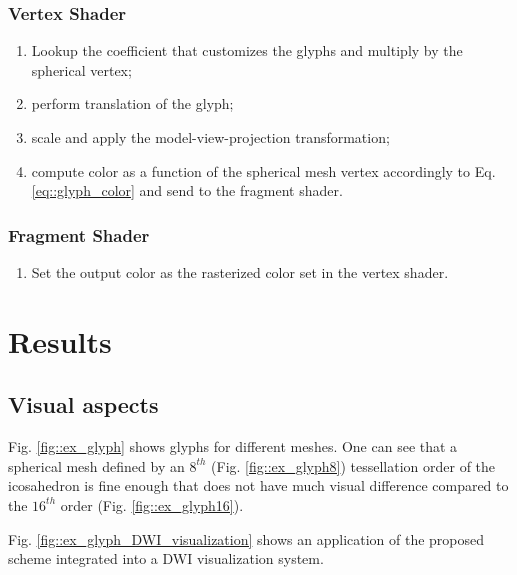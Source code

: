 \documentclass[twoside,twocolumn,10pt]{article}
\begin{document}
\subsubsection{Vertex Shader}
\begin{enumerate}
    \item Lookup the coefficient that customizes the glyphs and multiply by the spherical vertex;
    \item perform translation of the glyph;
    \item scale and apply the model-view-projection transformation;
    \item compute color as a function of the spherical mesh vertex accordingly to Eq. \ref{eq::glyph_color} and send to the fragment shader.
\end{enumerate}
\subsubsection{Fragment Shader}
\begin{enumerate}
    \item Set the output color as the rasterized color set in the vertex shader.
\end{enumerate}





\section{Results}
\label{sec::results}

\subsection{Visual aspects}

Fig. \ref{fig::ex_glyph} shows glyphs for different meshes. One can see that a spherical mesh defined by an $8^{th}$ (Fig. \ref{fig::ex_glyph8}) tessellation order of the icosahedron is fine enough that does not have much visual difference compared to the $16^{th}$ order (Fig. \ref{fig::ex_glyph16}).


Fig. \ref{fig::ex_glyph_DWI_visualization} shows an application of the proposed scheme integrated into a DWI visualization system.
\end{document}
